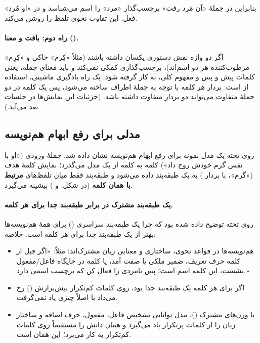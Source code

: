 
بنابراین در جملهٔ «آن مَرد رفت» برچسب‌گذار «مرد» را اسم می‌شناسد و در «او مُرد» فعل. این تفاوت نحوی تلفظ را روشن می‌کند.

\paragraph{راه دوم: بافت و معنا ().}
اگر دو واژه نقش دستوری یکسان داشته باشند (مثلاً «کِرم» خاکی و «کِرِم» مرطوب‌کننده هر دو اسم‌اند)، برچسب‌گذاری کمکی نمی‌کند و باید معنای جمله، یعنی کلمات پیش و پس و مفهوم کلی، به کار گرفته شود. یک راه یادگیری ماشینی، استفاده از  است: بردار هر کلمه با توجه به جملهٔ اطراف ساخته می‌شود، پس یک کلمه در دو جملهٔ متفاوت می‌تواند دو بردار متفاوت داشته باشد. (جزئیات این نمایش‌ها در جلسات بعد می‌آید.)

\subsection{مدلی برای رفع ابهام هم‌نویسه}
روی تخته یک مدل نمونه برای رفع ابهام هم‌نویسه نشان داده شد. جملهٔ ورودی («او با نفس گرم خودش روح داد») کلمه به کلمه از یک مدل  می‌گذرد؛ نمایش کلمهٔ هدف («گرم»، با بردار ) به یک طبقه‌بند داده می‌شود و طبقه‌بند فقط میان تلفظ‌های \textbf{مرتبط با همان کلمه} (در شکل:  و ) بیشینه می‌گیرد.


\paragraph{یک طبقه‌بند مشترک در برابر طبقه‌بند جدا برای هر کلمه.}
روی تخته توضیح داده شده بود که چرا یک طبقه‌بند سراسری () برای همهٔ هم‌نویسه‌ها بهتر از یک طبقه‌بند جدا برای هر کلمه است. خلاصه:
\begin{itemize}
  \item هم‌نویسه‌ها در قواعد نحوی، ساختاری و معنایی زبان مشترک‌اند؛ مثلاً: «اگر قبل از کلمه حرف تعریف، ضمیر ملکی یا صفت آمد، یا کلمه در جایگاه فاعل/مفعول نشست، این کلمه اسم است؛ پس نامزدی را فعال کن که برچسب اسمی دارد.»
  \item اگر برای هر کلمه یک طبقه‌بند جدا بود، روی کلمات کم‌تکرار بیش‌برازش () رخ می‌داد یا اصلاً چیزی یاد نمی‌گرفت.
  \item با وزن‌های مشترک ()، مدل توانایی تشخیص فاعل، مفعول، حرف اضافه و ساختار زبان را از کلمات پرتکرار یاد می‌گیرد و همان دانش را مستقیماً روی کلمات کم‌تکرار به کار می‌برد؛ این همان  است.
\end{itemize}

